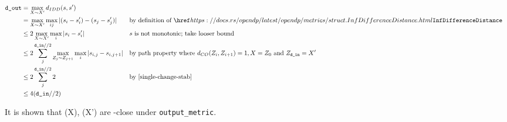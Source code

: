\documentclass{article}
\begin{document}
\begin{align*}
    \dout &= \max\limits_{X \sim X'} d_{IDD}(s, s') \\
    &= \max\limits_{X \sim X'} \max\limits_{ij} |(s_i - s'_i) - (s_j - s'_j)| &&\text{by definition of }\rustdoc{metrics/struct}{InfDifferenceDistance} \\
    &\leq 2 \max\limits_{X \sim X'} \max\limits_{i} |s_i - s'_i| &&\text{$s$ is not monotonic; take looser bound}\\
    &\leq 2 \sum_j^{\din // 2} \max\limits_{Z_{j} \sim Z_{j+1}} \max\limits_{i} |s_{i,j} - s_{i,j+1}| &&\text{by path property where } d_{CO}(Z_i, Z_{i+1}) = 1, X = Z_0 \text{ and } Z_\din = X' \\
    &\leq 2 \sum_j^{\din // 2} 2 &&\text{by \ref{single-change-stab}} \\
    &\leq 4 (\din // 2) \\
\end{align*}


It is shown that \function(X), \function(X') are \dout-close under \texttt{output\_metric}.
\end{document}
